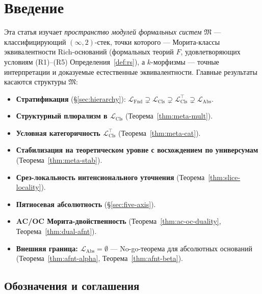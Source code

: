 \documentclass[11pt]{article}
\theoremstyle{plain}
\theoremstyle{definition}
\newcommand{\fM}{\mathfrak{M}}
\newcommand{\LFnd}{\mathcal{L}_{\mathrm{Fnd}}}
\newcommand{\LCls}{\mathcal{L}_{\mathrm{Cls}}}
\newcommand{\LClsMax}{\mathcal{L}_{\mathrm{Cls}}^{\top}}
\newcommand{\LAbs}{\mathcal{L}_{\mathrm{Abs}}}
\begin{document}
\begin{abstract}
\smallskip
\noindent\textbf{Ключевые слова:} пространство модулей формальных систем, классифицирующие $2$-стеки, категорная логика, $(\infty, n)$-категории, теория высших топосов, интенсиональная теория типов, мета-классификация, эффективный топос, no-go-теоремы.

\smallskip
\noindent\textbf{MSC2020:} 03A05, 03B30, 03C45, 03F40, 18A05, 18N10, 18N50, 18N60, 18N65.

\end{abstract}

\newpage
\tableofcontents
\newpage

\section{Введение}

Эта статья изучает \emph{пространство модулей формальных систем} $\fM$ — классифицирующий $(\infty, 2)$-стек, точки которого — Морита-классы эквивалентности Rich-оснований (формальных теорий $F$, удовлетворяющих условиям (R1)--(R5) Определения~\ref{def:rs}), а $k$-морфизмы — точные интерпретации и доказуемые естественные эквивалентности. Главные результаты касаются структуры $\fM$:
\begin{itemize}
\item \textbf{Стратификация} (\S\ref{sec:hierarchy}): $\LFnd \supsetneq \LCls \supsetneq \LClsMax \supsetneq \LAbs$.
\item \textbf{Структурный плюрализм в $\LCls$} (Теорема~\ref{thm:meta-mult}).
\item \textbf{Условная категоричность $\LClsMax$} (Теорема~\ref{thm:meta-cat}).
\item \textbf{Стабилизация на теоретическом уровне с восхождением по универсумам} (Теорема~\ref{thm:meta-stab}).
\item \textbf{Срез-локальность интенсионального уточнения} (Теорема~\ref{thm:slice-locality}).
\item \textbf{Пятиосевая абсолютность} (\S\ref{sec:five-axis}).
\item \textbf{AC/OC Морита-двойственность} (Теорема~\ref{thm:ac-oc-duality}, Теорема~\ref{thm:dual-afnt}).
\item \textbf{Внешняя граница: $\LAbs = \emptyset$} --- No-go-теорема для абсолютных оснований (Теорема~\ref{thm:afnt-alpha}, Теорема~\ref{thm:afnt-beta}).
\end{itemize}

\subsection{Обозначения и соглашения}
\end{document}
